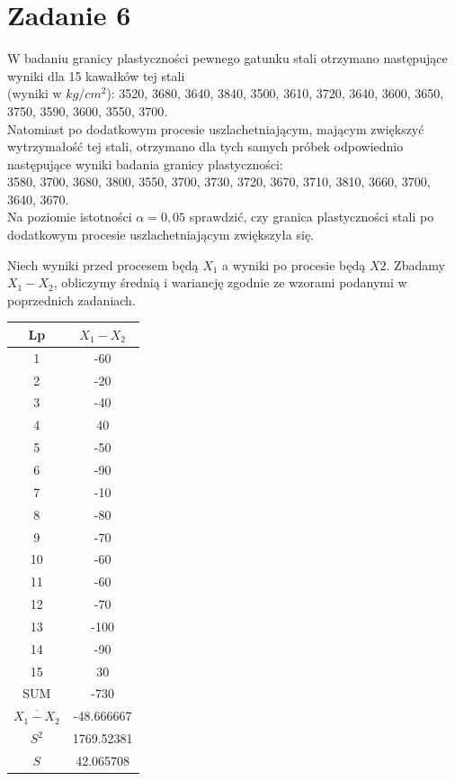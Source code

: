 \documentclass{article}
\begin{document}
\newpage
\section{Zadanie 6}
W badaniu granicy plastyczności pewnego gatunku stali otrzymano następujące wyniki dla 15 kawałków tej stali \\
(wyniki w $kg/{cm}^2$): 3520, 3680, 3640, 3840, 3500, 3610, 3720, 3640, 3600, 3650, 3750, 3590, 3600, 3550, 3700. \\
Natomiast po dodatkowym procesie uszlachetniającym, mającym zwiększyć wytrzymałość tej stali, otrzymano dla tych samych próbek odpowiednio następujące wyniki badania granicy plastyczności:\\
3580, 3700, 3680, 3800, 3550, 3700, 3730, 3720, 3670, 3710, 3810, 3660, 3700, 3640, 3670. \\
Na poziomie istotności $\alpha=0,05$ sprawdzić, czy granica plastyczności stali po dodatkowym procesie uszlachetniającym zwiększyła się. \\ \par

Niech wyniki przed procesem będą $X_1$ a wyniki po procesie będą $X2$. Zbadamy $X_1-X_2$, obliczymy średnią i wariancję zgodnie ze wzorami podanymi w poprzednich zadaniach.
\begin{center} \begin{tabular}{|c|c|} \hline
Lp & $X_1-X_2$ \\ \hline
1 & -60 \\ \hline
2 & -20 \\ \hline
3 & -40 \\ \hline
4 & 40 \\ \hline
5 & -50 \\ \hline
6 & -90 \\ \hline
7 & -10 \\ \hline
8 & -80 \\ \hline
9 & -70 \\ \hline
10 & -60 \\ \hline
11  & -60 \\ \hline
12 & -70 \\ \hline
13 & -100 \\ \hline
14 & -90 \\ \hline
15 & 30 \\ \hline
SUM & -730 \\ \hline
$\overline{X_1-X_2}$ & -48.666667 \\ \hline
$S^2$ & 1769.52381\\ \hline
$S$ & 42.065708 \\ \hline
\end{tabular} \end{center}
\end{document}
